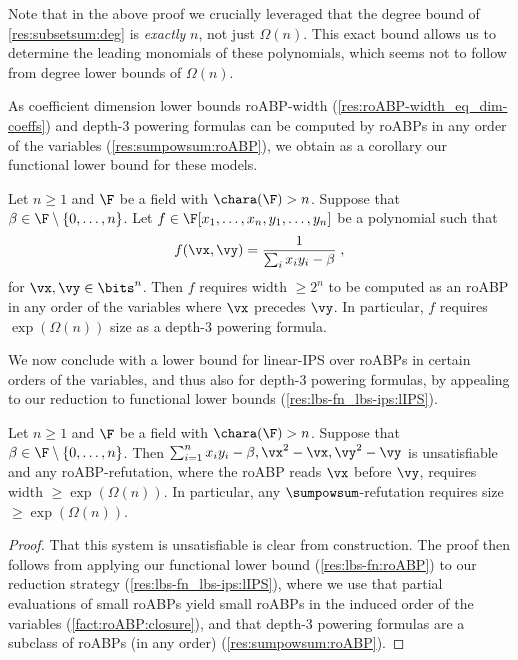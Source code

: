 \documentclass{toc}
\begin{document}
Note that in the above proof we crucially leveraged that the degree bound of \autoref{res:subsetsum:deg} is \emph{exactly} $n$, not just $\Omega(n)$.  This exact bound allows us to determine the leading monomials of these polynomials, which seems not to follow from degree lower bounds of $\Omega(n)$.

As coefficient dimension lower bounds roABP-width (\autoref{res:roABP-width_eq_dim-coeffs}) and depth-3 powering formulas can be computed by roABPs in any order of the variables (\autoref{res:sumpowsum:roABP}), we obtain as a corollary our functional lower bound for these models.

\begin{corollarywp}\label{res:lbs-fn:roABP}
        Let $n\ge 1$ and $\F$ be a field with $\chara(\F)>n$.  Suppose that $\beta\in\F\setminus\{0,\ldots,n\}$.  Let $f\in\F[x_1,\ldots,x_n,y_1,\ldots,y_n]$ be a polynomial such that
        \[
                f(\vx,\vy)=\frac{1}{\sum_i x_iy_i-\beta}
                \;,
        \]
        for $\vx,\vy\in\bits^n$.  Then $f$ requires width $\ge 2^n$ to be computed as an roABP in any order of the variables where $\vx$ precedes $\vy$.  In particular, $f$ requires
%
$\exp(\Omega(n))$ size    %
as a depth-$3$ powering formula.
\end{corollarywp}

We now conclude with a lower bound for linear-IPS over roABPs in certain orders of the variables, and thus also for depth-$3$ powering formulas, by appealing to our reduction to functional lower bounds (\autoref{res:lbs-fn_lbs-ips:lIPS}).

\begin{corollary}\label{res:lbs-fn:lbs-ips:fixed-order}
        Let $n\ge 1$ and $\F$ be a field with $\chara(\F)>n$.  Suppose that $\beta\in \F\setminus\{0,\ldots,n\}$.  Then $\sum_{i=1}^n x_iy_i-\beta,\vx^2-\vx,\vy^2-\vy$ is unsatisfiable and any roABP-\lIPS refutation, where the roABP reads $\vx$ before $\vy$, requires width $\ge \exp(\Omega(n))$.  In particular, any $\sumpowsum$-\lIPS refutation requires size $\ge\exp(\Omega(n))$.
\end{corollary}
\begin{proof}
        That this system is unsatisfiable is clear from construction.  The proof then follows from applying our functional lower bound (\autoref{res:lbs-fn:roABP}) to our reduction strategy (\autoref{res:lbs-fn_lbs-ips:lIPS}), where we use that partial evaluations of small roABPs yield small roABPs in the induced order of the variables (\autoref{fact:roABP:closure}), and that depth-3 powering formulas are a subclass of roABPs (in any order) (\autoref{res:sumpowsum:roABP}).
\end{proof}
\end{document}
